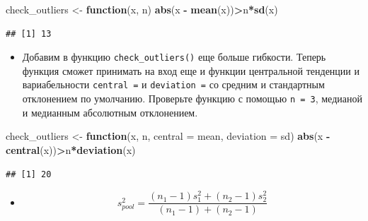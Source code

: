 \documentclass[]{book}
\newenvironment{Shaded}{\begin{snugshade}}{\end{snugshade}}
\newcommand{\KeywordTok}[1]{\textcolor[rgb]{0.13,0.29,0.53}{\textbf{#1}}}
\newcommand{\DataTypeTok}[1]{\textcolor[rgb]{0.13,0.29,0.53}{#1}}
\newcommand{\DecValTok}[1]{\textcolor[rgb]{0.00,0.00,0.81}{#1}}
\newcommand{\StringTok}[1]{\textcolor[rgb]{0.31,0.60,0.02}{#1}}
\newcommand{\ControlFlowTok}[1]{\textcolor[rgb]{0.13,0.29,0.53}{\textbf{#1}}}
\newcommand{\OperatorTok}[1]{\textcolor[rgb]{0.81,0.36,0.00}{\textbf{#1}}}
\newcommand{\NormalTok}[1]{#1}
\providecommand{\tightlist}{%
  \setlength{\itemsep}{0pt}\setlength{\parskip}{0pt}}
\begin{document}
\begin{Shaded}
\begin{Highlighting}[]
\NormalTok{check_outliers <-}\StringTok{ }\ControlFlowTok{function}\NormalTok{(x, n) }\KeywordTok{abs}\NormalTok{(x }\OperatorTok{-}\StringTok{ }\KeywordTok{mean}\NormalTok{(x))}\OperatorTok{>}\NormalTok{n}\OperatorTok{*}\KeywordTok{sd}\NormalTok{(x)}
\end{Highlighting}
\end{Shaded}

\begin{Shaded}
\end{Shaded}

\begin{verbatim}
## [1] 13
\end{verbatim}

\begin{itemize}
\tightlist
\item
  Добавим в функцию \texttt{check\_outliers()} еще больше гибкости.
  Теперь функция сможет принимать на вход еще и функции центральной
  тенденции и вариабельности \texttt{central\ =} и \texttt{deviation\ =}
  со средним и стандартным отклонением по умолчанию. Проверьте функцию с
  помощью \texttt{n\ =\ 3}, медианой и медианным абсолютным отклонением.
\end{itemize}

\begin{Shaded}
\begin{Highlighting}[]
\NormalTok{check_outliers <-}\StringTok{ }\ControlFlowTok{function}\NormalTok{(x, n, }\DataTypeTok{central =}\NormalTok{ mean, }\DataTypeTok{deviation =}\NormalTok{ sd) }\KeywordTok{abs}\NormalTok{(x }\OperatorTok{-}\StringTok{ }\KeywordTok{central}\NormalTok{(x))}\OperatorTok{>}\NormalTok{n}\OperatorTok{*}\KeywordTok{deviation}\NormalTok{(x)}
\end{Highlighting}
\end{Shaded}

\begin{Shaded}
\end{Shaded}

\begin{verbatim}
## [1] 20
\end{verbatim}

\begin{itemize}
\tightlist
\item
  \[s^2_{pool} = \frac {(n_1-1)s^2_1 + (n_2-1)s^2_2} {(n_1 - 1) + (n_2 -1)}\]
\end{itemize}


\end{document}
